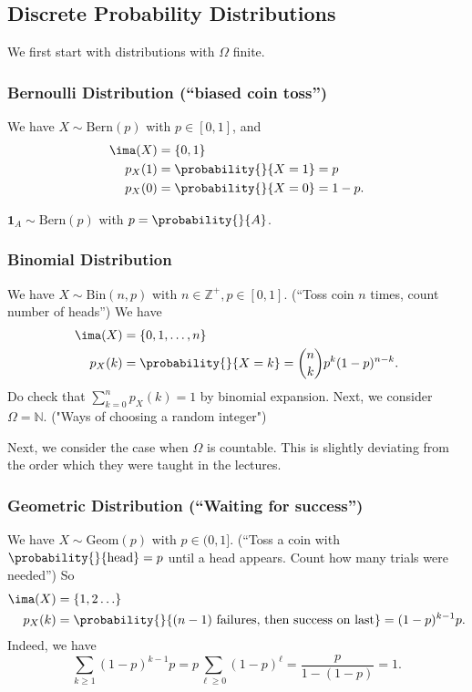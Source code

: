 \subsection{Discrete Probability Distributions}
We first start with distributions with \(\Omega\) finite.
\subsubsection{Bernoulli Distribution (``biased coin toss'')}
We have \(X \sim \mathrm{Bern}(p)\) with \(p \in [0,1]\), and
\begin{align*}
    \ima(X) &= \{0,1\}\\
    p_X(1) &= \probability{}{X = 1} = p\\
    p_X(0) &= \probability{}{X = 0} = 1-p.
\end{align*}
\begin{example}
    \(\textbf{1}_A \sim \mathrm{Bern}(p)\) with \(p = \probability{}{A}\).
\end{example}
\subsubsection{Binomial Distribution}
We have \(X \sim \mathrm{Bin}(n,p)\) with \(n \in \mathbb{Z}^+, p \in [0,1]\). (``Toss coin \(n\) times, count number of heads'') We have
\begin{align*}
    \ima(X) &= \{0,1, \ldots, n\}\\
    p_X(k) &= \probability{}{X = k} = \binom{n}{k}p^k (1-p)^{n-k}.
\end{align*}
Do check that \(\sum\limits_{k=0}^{n} p_X(k) = 1\) by binomial expansion.
Next, we consider \(\Omega=\mathbb{N}\). ("Ways of choosing a random integer")

Next, we consider the case when \(\Omega\) is countable. This is slightly deviating from the order which they were taught in the lectures.
\subsubsection{Geometric Distribution (``Waiting for success'')}
We have \(X \sim \mathrm{Geom}(p)\) with \(p \in (0,1]\). (``Toss a coin with \(\probability{}{\text{head}} =p\) until a head appears. Count how many trials were needed'') So
\begin{align*}
    \ima(X) &= \{1,2 \ldots\}\\
    p_X(k) &= \probability{}{(n-1)\text{ failures, then success on last}} = (1-p)^{k-1}p. 
\end{align*}
Indeed, we have
\[
    \sum\limits_{k\geq 1}(1-p)^{k-1}p = p \sum_{\ell\geq 0}(1-p)^\ell = \frac{p}{1 - (1-p)} = 1.
\]

